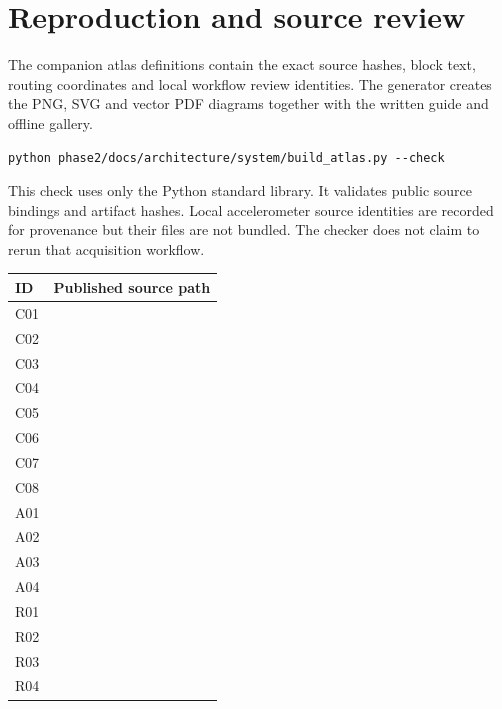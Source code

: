 \documentclass[11pt,letterpaper]{article}
\begin{document}
\section*{Reproduction and source review}
The companion atlas definitions contain the exact source hashes, block text, routing coordinates and local workflow review identities. The generator creates the PNG, SVG and vector PDF diagrams together with the written guide and offline gallery.
\begin{verbatim}
python phase2/docs/architecture/system/build_atlas.py --check
\end{verbatim}
This check uses only the Python standard library. It validates public source bindings and artifact hashes. Local accelerometer source identities are recorded for provenance but their files are not bundled. The checker does not claim to rerun that acquisition workflow.
\par\medskip\noindent\begin{tabularx}{\linewidth}{@{}p{0.4in}Y@{}}\toprule
\textbf{ID} & \textbf{Published source path} \\ \midrule
C01 &  \\[4pt]
C02 &  \\[4pt]
C03 &  \\[4pt]
C04 &  \\[4pt]
C05 &  \\[4pt]
C06 &  \\[4pt]
C07 &  \\[4pt]
C08 &  \\[4pt]
A01 &  \\[4pt]
A02 &  \\[4pt]
A03 &  \\[4pt]
A04 &  \\[4pt]
R01 &  \\[4pt]
R02 &  \\[4pt]
R03 &  \\[4pt]
R04 &  \\[4pt]
\bottomrule\end{tabularx}\clearpage
\end{document}
